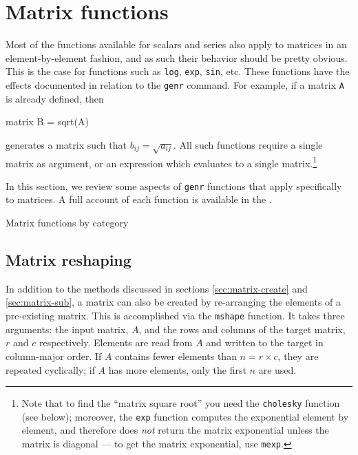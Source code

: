\section{Matrix functions}
\label{sec:matrix-func}

Most of the  functions available for scalars and series
also apply to matrices in an element-by-element fashion, and as such
their behavior should be pretty obvious. This is the case for
functions such as \texttt{log}, \texttt{exp}, \texttt{sin}, etc.
These functions have the effects documented in relation to the
\texttt{genr} command.  For example, if a matrix \texttt{A} is already
defined, then
%
\begin{code}
matrix B = sqrt(A)
\end{code}
%
generates a matrix such that $b_{ij} = \sqrt{a_{ij}}$.  All such
functions require a single matrix as argument, or an expression which
evaluates to a single matrix.\footnote{Note that to find the ``matrix
  square root'' you need the \texttt{cholesky} function (see below);
  moreover, the \texttt{exp} function computes the exponential element
  by element, and therefore does \emph{not} return the matrix
  exponential unless the matrix is diagonal --- to get the matrix
  exponential, use \texttt{mexp}.}

In this section, we review some aspects of \texttt{genr} functions that
apply specifically to matrices. A full account of each function is
available in the \GCR.

\newlength{\cwid}
\setlength{\cwid}{0.1\textwidth}

\begin{table}[htbp]
\centering

\caption{Matrix functions by category}
\label{tab:matrix_funcs_cat}
\end{table}

\subsection{Matrix reshaping}
\label{matrix-mshape}

In addition to the methods discussed in sections
\ref{sec:matrix-create} and \ref{sec:matrix-sub}, a matrix can also be
created by re-arranging the elements of a pre-existing matrix. This is
accomplished via the \texttt{mshape} function. It takes three
arguments: the input matrix, $A$, and the rows and columns of the
target matrix, $r$ and $c$ respectively.  Elements are read from $A$
and written to the target in column-major order.  If $A$ contains
fewer elements than $n = r \times c$, they are repeated cyclically; if
$A$ has more elements, only the first $n$ are used.

